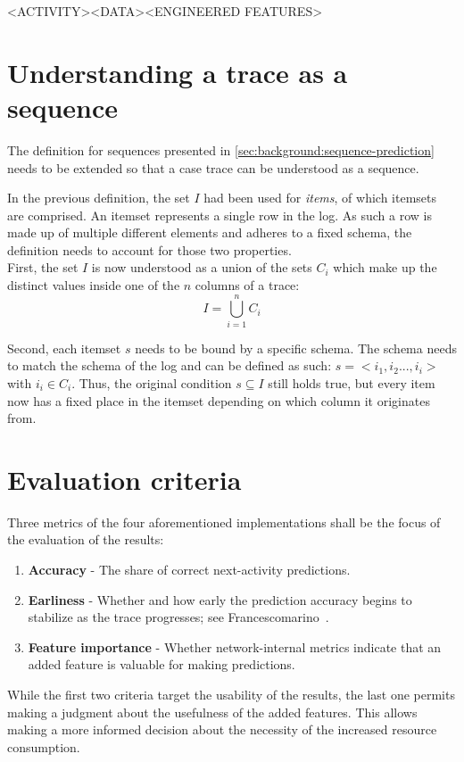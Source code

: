 <ACTIVITY><DATA><ENGINEERED FEATURES>

\section{Understanding a trace as a sequence}
The definition for sequences presented in \autoref{sec:background:sequence-prediction} needs to be extended so that a case trace can be understood as a sequence.

In the previous definition, the set $I$ had been used for \textit{items}, of which itemsets are comprised. An itemset represents a single row in the log. As such a row is made up of multiple different elements and adheres to a fixed schema, the definition needs to account for those two properties.\\

First, the set $I$ is now understood as a union of the sets $C_i$ which make up the distinct values inside one of the $n$ columns of a trace:
$$I = \bigcup\limits_{i=1}^{n} C_{i}$$

Second, each itemset $s$ needs to be bound by a specific schema. The schema needs to match the schema of the log and can be defined as such: $s = <i_1, i_2 ..., i_i>$ with $i_i \in C_i$. Thus, the original condition $s \subseteq I$ still holds true, but every item now has a fixed place in the itemset depending on which column it originates from.

\section{Evaluation criteria}
Three metrics of the four aforementioned implementations shall be the focus of the evaluation of the results:

\begin{enumerate}
    \item\textbf{Accuracy} - The share of correct next-activity predictions.
    \item\textbf{Earliness} - Whether and how early the prediction accuracy begins to stabilize as the trace progresses; see Francescomarino~\cite{francescomarino2015}.
    \item\textbf{Feature importance} - Whether network-internal metrics indicate that an added feature is valuable for making predictions.
\end{enumerate}

While the first two criteria target the usability of the results, the last one permits making a judgment about the usefulness of the added features. This allows making a more informed decision about the necessity of the increased resource consumption.